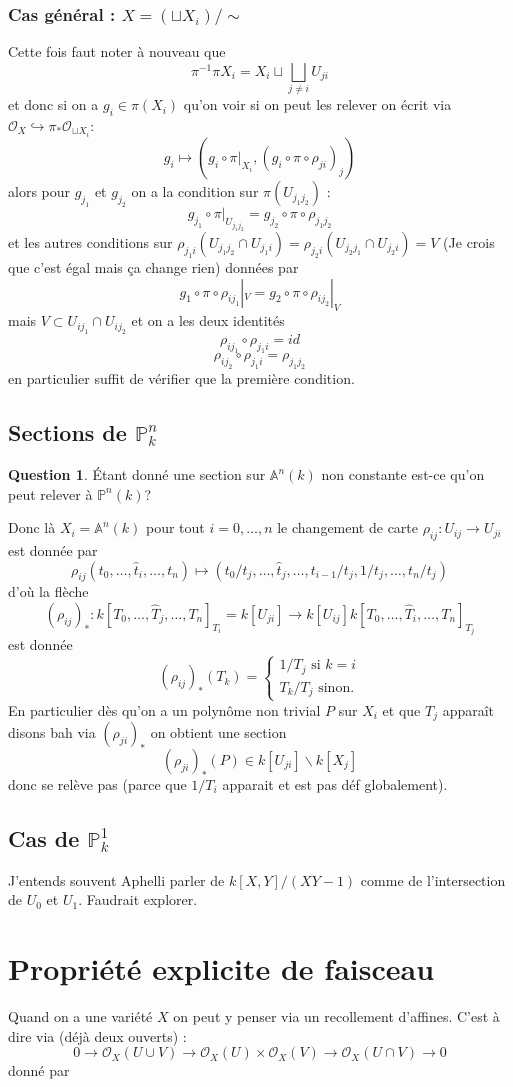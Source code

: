 \documentclass[a4paper,12pt]{book}
\newcommand{\A}{\mathbb{A}}
\newcommand{\Or}{\mathcal{O}}
\renewcommand{\Pr}{\mathbb{P}}
\theoremstyle{plain}
\theoremstyle{definition}
\newtheorem{quest}{Question}
\theoremstyle{remark}
\begin{document}
\subsection{Cas général : $X=(\sqcup X_i)/\sim$}
Cette fois faut noter à nouveau que 
\[\pi^{-1}\pi X_i=X_i\sqcup\bigsqcup_{j\ne i} U_{ji}\]
et donc si on a $g_i\in \pi(X_i)$ qu'on voir si on peut les 
relever on écrit via $\Or_X\hookrightarrow \pi_*\Or_{\sqcup X_i}$:
\[g_i\mapsto (g_i\circ \pi|_{X_i}, (g_i\circ\pi\circ\rho_{ji})_j)\]
alors pour $g_{j_1}$ et $g_{j_2}$ on a la condition sur 
$\pi(U_{j_1j_2})$ :
\[g_{j_1}\circ\pi|_{U_{j_1j_2}}=g_{j_2}\circ\pi\circ\rho_{j_1j_2}\]
et les autres conditions sur $\rho_{j_1i}(U_{j_1j_2}\cap U_{j_1i})=
\rho_{j_2i}(U_{j_2j_1}\cap U_{j_2i})=V$ (Je crois que c'est égal
mais ça change rien) données par 
\[g_1\circ\pi\circ\rho_{ij_1}|_V=g_2\circ\pi\circ \rho_{ij_2}|_V\]
mais $V\subset U_{ij_1}\cap U_{ij_2}$ et on a les deux identités
\[\rho_{ij_1}\circ\rho_{j_1i}=id\]
\[\rho_{ij_2}\circ\rho_{j_1i}=\rho_{j_1j_2}\]
en particulier suffit de vérifier que la première condition.

\section{Sections de $\Pr_k^n$}
\begin{quest}
  Étant donné une section sur $\A^n(k)$ non constante est-ce 
qu'on peut relever à $\Pr^n(k)$?
\end{quest}
Donc là $X_i=\A^n(k)$ pour tout $i=0,\ldots, n$ le changement de
carte 
$\rho_{ij}\colon U_{ij}\to U_{ji}$ est donnée par 
\[\rho_{ij}(t_0,\ldots,\hat t_i,\ldots, t_n)\mapsto (t_0/t_j,\ldots,\hat t_j, \ldots, t_{i-1}/t_j,1/t_j,\ldots, t_n/t_j)\]
d'où la flèche
\[(\rho_{ij})_*\colon k[T_0,\ldots, \hat T_j, \ldots, T_n]_{T_i}=k[U_{ji}]\to k[U_{ij}] k[T_0,\ldots,\hat T_i,\ldots, T_n]_{T_j}\]
est donnée \[(\rho_{ij})_*(T_k)=\begin{cases} 1/T_j\textrm{ si $k=i$}\\ T_k/T_j\textrm{ sinon.}\end{cases}\]
En particulier dès qu'on a un polynôme non trivial $P$ sur $X_i$ et
que $T_j$ apparaît disons bah via $(\rho_{ji})_*$ on obtient 
une section \[(\rho_{ji})_*(P)\in k[U_{ji}]\backslash k[X_j]\] donc
se relève pas (parce que $1/T_i$ apparait et est pas déf 
globalement).
\section{Cas de $\Pr_k^1$}
J'entends souvent Aphelli parler de $k[X,Y]/(XY-1)$ comme de 
l'intersection de $U_0$ et $U_1$. Faudrait explorer.




\chapter{Propriété explicite de faisceau}
Quand on a une variété $X$ on peut y penser via un recollement
d'affines. C'est à dire via (déjà deux ouverts) :
\[0\to \Or_X(U\cup V)\to \Or_X(U)\times
\Or_X(V)\to \Or_X(U\cap V)\to 0\]
donné par 




\printbibliography
\end{document}
